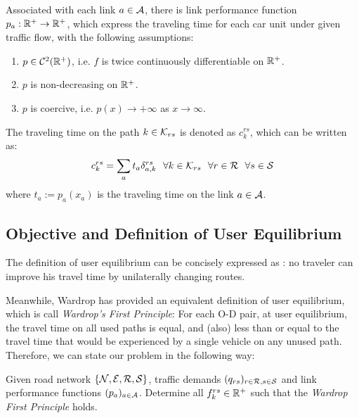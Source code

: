 \documentclass{article}
\begin{document}
Associated with each link $ a \in \mathcal{A} $, there is link performance function $ p_a : \mathbb{R}^+ \rightarrow \mathbb{R}^+ $, which express the traveling time for each car unit under given traffic flow, with the following assumptions:
\begin{enumerate}
    \item $ p \in \mathcal{C}^2 (\mathbb{R}^+) $, i.e. $ f $ is twice continuously differentiable on $ \mathbb{R}^+ $.
    \item $ p $ is non-decreasing on $ \mathbb{R}^+ $.
    \item $ p $ is coercive, i.e. $ p(x) \rightarrow + \infty $ as $ x \rightarrow \infty $.
\end{enumerate}
The traveling time on the path $ k \in \mathcal{K}_{rs} $ is denoted as $ c_k^{rs} $, which can be written as: 
\begin{equation} \label{eq-link-time-to-path-time}
    c_k^{rs} = \sum_a t_a \delta_{a, k}^{rs} ~~ \forall k \in \mathcal{K}_{rs} ~~ \forall r \in \mathcal{R} ~~ \forall s \in \mathcal{S}
\end{equation}
where $ t_a := p_a (x_a) $ is the traveling time on the link $ a \in \mathcal{A} $.

\subsection{Objective and Definition of User Equilibrium}

The definition of user equilibrium can be concisely expressed as \cite{Shef85}: no traveler can improve his travel time by unilaterally changing routes.

Meanwhile, Wardrop \cite{wardrop1952road} has provided an equivalent definition of user equilibrium, which is call \textit{Wardrop's First Principle}: For each O-D pair, at user equilibrium, the travel time on all used paths is equal, and (also) less than or equal to the travel time that would be experienced by a single vehicle on any unused path. Therefore, we can state our problem in the following way:

\begin{prob}
    Given road network $ \{ \mathcal{N}, \mathcal{E}, \mathcal{R}, \mathcal{S} \} $, traffic demands $ (q_{rs})_{r \in \mathcal{R}, s \in \mathcal{S}} $ and link performance functions $ (p_a)_{a \in \mathcal{A}} $. Determine all $ f_k^{rs} \in \mathbb{R}^+ $ such that the \textit{Wardrop First Principle} holds.
\end{prob}
\end{document}
